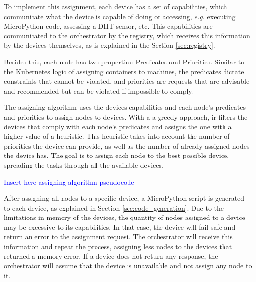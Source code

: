 To implement this assignment, each device has a set of capabilities, which communicate what the device is capable of doing or accessing, \textit{e.g.} executing MicroPython code, assessing a DHT sensor, etc. This capabilities are communicated to the orchestrator by the registry, which receives this information by the devices themselves, as is explained in the Section \ref{sec:registry}. 

Besides this, each node has two properties: Predicates and Priorities. Similar to the Kubernetes logic of assigning containers to machines, the predicates dictate constraints that cannot be violated, and priorities are requests that are advisable and recommended but can be violated if impossible to comply. 

The assigning algorithm uses the devices capabilities and each node's predicates and priorities to assign nodes to devices. With a a greedy approach, ir filters the devices that comply with each node's predicates and assigns the one with a higher value of a heuristic. This heuristic takes into account the number of priorities the device can provide, as well as the number of already assigned nodes the device has. The goal is to assign each node to the best possible device, spreading the tasks through all the available devices.

\textcolor{blue}{Insert here assigning algorithm pseudocode}

    
    

After assigning all nodes to a specific device, a MicroPython script is generated to each device, as explained in Section \ref{sec:code_generation}. Due to the limitations in memory of the devices, the quantity of nodes assigned to a device may be excessive to its capabilities. In that case, the device will fail-safe and return an error to the assignment request. The orchestrator will receive this information and repeat the process, assigning less nodes to the devices that returned a memory error. If a device does not return any response, the orchestrator will assume that the device is unavailable and not assign any node to it.

